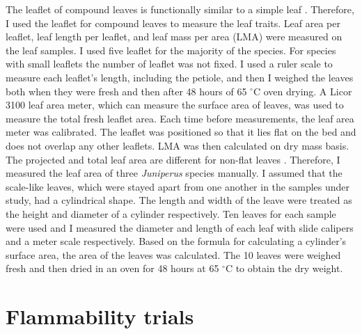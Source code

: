 \documentclass[12pt]{report}
\begin{document}
The leaflet of compound leaves is functionally similar to a simple leaf \citep{perez2016corrigendum}. Therefore, I used the leaflet for compound leaves to measure the leaf traits. Leaf area per leaflet, leaf length per leaflet, and leaf mass per area (LMA) were measured on the leaf samples. I used five leaflet for the majority of the species. For species with small leaflets the number of leaflet was not fixed.
I used a ruler scale to measure each leaflet's length, including the petiole, and then I weighed the leaves both when they were fresh and then after 48 hours of 65 $^{\circ}$C oven drying. A Licor 3100 leaf area meter, which can measure the surface area of leaves, was used to measure the total fresh leaflet area. Each time before measurements, the leaf area meter was calibrated. The leaflet was positioned so that it lies flat on the bed and does not overlap any other leaflets.   %
LMA was then calculated on  dry mass basis. The projected and total leaf area are different for non-flat leaves \citep{perez2016corrigendum, cornelissen2003handbook}. Therefore, I measured the leaf area of three \emph{Juniperus} species manually. I assumed that the scale-like leaves, which were stayed apart from one another in the samples under study, had a cylindrical shape. The length and width of the leave were treated as the height and diameter of a cylinder respectively. Ten leaves for each sample were used and I measured the diameter and length of each leaf with slide calipers and a meter scale respectively. Based on the formula for calculating a cylinder's surface area, the area of the leaves was calculated. The 10 leaves were weighed fresh and then dried in an oven for 48 hours at 65 $^{\circ}$C to obtain the dry weight.


\section{Flammability trials}
\end{document}
